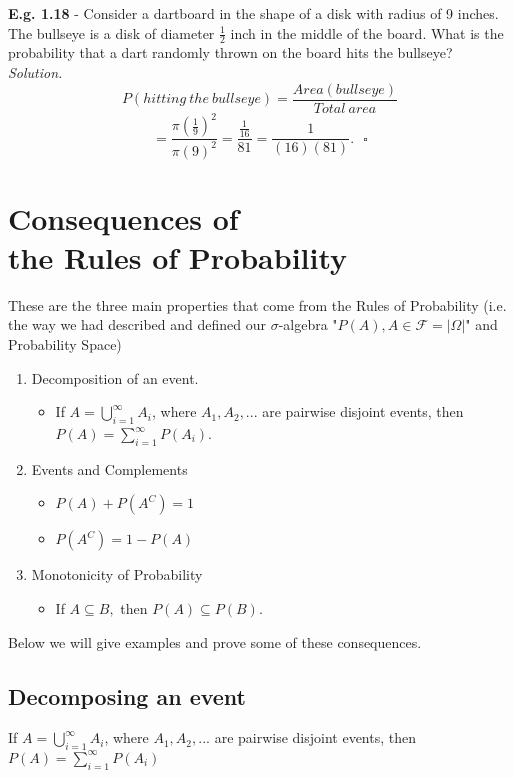 \documentclass[12pt]{book}
\begin{document}
\noindent \textbf{E.g. 1.18} - Consider a dartboard in the shape of a disk with radius of 9 inches. The bullseye is a disk of diameter $\frac{1}{2}$ inch in the middle of the board. What is the probability that a dart randomly thrown on the board hits the bullseye?\\
\textit{Solution.}
$$P(hitting~the~bullseye) = \frac{Area(bullseye)}{Total~area}$$
$$ = \frac{\pi \left( \frac{1}{9} \right)^2}{\pi (9)^2} = \frac{\frac{1}{16}}{81} = \frac{1}{(16)(81)}.~~~\square$$




\section{Consequences of \\the Rules of Probability} 
These are the three main properties that come from the Rules of Probability (i.e. the way we had described and defined our $\sigma$-algebra "$P(A),A\in\mathcal{F}=|\Omega|$" and Probability Space)
\begin{enumerate}
\item Decomposition of an event.
\begin{itemize} \item If $A = \bigcup\limits_{i=1}^\infty A_i$, where $A_1,A_2,...$ are pairwise disjoint events, then $P(A) = \sum\limits_{i=1}^\infty P(A_i)$.\end{itemize}
\item Events and Complements
	\begin{itemize} 
		\item $P(A)+P(A^C)=1$
		\item $P(A^C)=1-P(A)$
	\end{itemize}
\item Monotonicity of Probability
\begin{itemize} \item If $A\subseteq B,$ then $P(A)\subseteq P(B)$.\end{itemize}
\end{enumerate}
Below we will give examples and prove some of these consequences.

\subsection{Decomposing an event}
If $A = \bigcup\limits_{i=1}^\infty A_i$, where $A_1,A_2,...$ are pairwise disjoint events, then $P(A) = \sum\limits_{i=1}^\infty P(A_i)$
\end{document}
